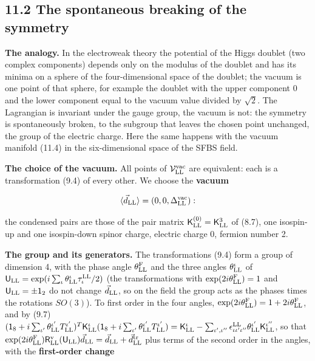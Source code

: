 \documentclass[
  10pt,
]{article}
\begin{document}
\hypertarget{the-spontaneous-breaking-of-the-symmetry}{%
\subsection{11.2 The spontaneous breaking of the
symmetry}\label{the-spontaneous-breaking-of-the-symmetry}}

\textbf{The analogy.} In the electroweak theory the potential of the
Higgs doublet (two complex components) depends only on the modulus of
the doublet and has its minima on a sphere of the four-dimensional space
of the doublet; the vacuum is one point of that sphere, for example the
doublet with the upper component 0 and the lower component equal to the
vacuum value divided by \(\sqrt2\). The Lagrangian is invariant under
the gauge group, the vacuum is not: the symmetry is spontaneously
broken, to the subgroup that leaves the chosen point unchanged, the
group of the electric charge. Here the same happens with the vacuum
manifold (11.4) in the six-dimensional space of the SFBS field.

\textbf{The choice of the vacuum.} All points of
\(\mathcal V^{\rm vac}_{\rm LL}\) are equivalent: each is a
transformation (9.4) of every other. We choose the \textbf{vacuum}

\[\langle\vec d_{\rm LL}\rangle=(0,0,\Delta^{\rm vac}_{\rm LL}):\]

the condensed pairs are those of the pair matrix
\(\mathsf K^{(0)}_{\rm LL}=\mathsf K^3_{\rm LL}\) of (8.7), one
isospin-up and one isospin-down spinor charge, electric charge 0,
fermion number 2.

\textbf{The group and its generators.} The transformations (9.4) form a
group of dimension 4, with the phase angle \(\theta^{\rm F}_{\rm LL}\)
and the three angles \(\theta^\iota_{\rm LL}\) of
\(\mathsf U_{\rm LL}=\exp(i\sum_\iota\theta^\iota_{\rm LL}\tau^{\rm LL}_\iota/2)\)
(the transformations with \(\exp(2i\theta^{\rm F}_{\rm LL})=1\) and
\(\mathsf U_{\rm LL}=\pm\mathsf 1_2\) do not change \(\vec d_{\rm LL}\),
so on the field the group acts as the phases times the rotations
\(SO(3)\)). To first order in the four angles,
\(\exp(2i\theta^{\rm F}_{\rm LL})=1+2i\theta^{\rm F}_{\rm LL}\), and by
(9.7)
\((\mathsf 1_8+i\sum_{\iota'}\theta^{\iota'}_{\rm LL}T^{\iota'}_{\rm LL})^T\mathsf K^\iota_{\rm LL}(\mathsf 1_8+i\sum_{\iota'}\theta^{\iota'}_{\rm LL}T^{\iota'}_{\rm LL})=\mathsf K^\iota_{\rm LL}-\sum_{\iota',\iota''}\epsilon^{\rm LL}_{\iota\iota'\iota''}\theta^{\iota'}_{\rm LL}\mathsf K^{\iota''}_{\rm LL}\),
so that
\(\exp(2i\theta^{\rm F}_{\rm LL})\mathsf R^{\rm v}_{\rm LL}(\mathsf U_{\rm LL})\vec d_{\rm LL}=\vec d_{\rm LL}+\vec d^{\rm tr}_{\rm LL}\)
plus terms of the second order in the angles, with the
\textbf{first-order change}
\end{document}
